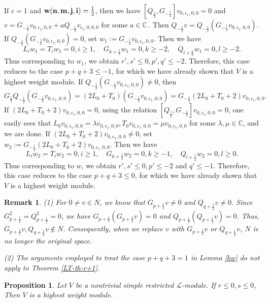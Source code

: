 \documentclass[12pt]{article}
\def\ssc{\scriptscriptstyle}
\def\C{\mathbb{C}{\ssc\,}}
\numberwithin{equation}{section}
\newtheorem{rema}[theo]{Remark}
\newtheorem{prop}[theo]{Proposition}
\begin{document}
If $c=1$ and ${\bf w(n,m,j,i)}=\frac{1}{2}$, then we have $[Q_{\frac{1}{2}},G_{-\frac{1}{2}}]v_{0,\epsilon_1,0,0}=0$ and $v=G_{-\frac{1}{2}}v_{0,\epsilon_1,0,0}+a Q_{-\frac{1}{2}}v_{\epsilon_1,0,0,0}$ for some $a\in\C$.
Then  $Q_{-\frac{1}{2}}v=Q_{-\frac{1}{2}}(G_{-\frac{1}{2}}v_{0,\epsilon_1,0,0}).$ If $Q_{-\frac{1}{2}}(G_{-\frac{1}{2}}v_{0,\epsilon_1,0,0})=0$, set $w_1:=G_{-\frac{1}{2}}v_{0,\epsilon_1,0,0}$. Then  we  have
$$L_iw_1=T_iw_1=0, i\ge 1,\quad G_{k+\frac{1}{2}}w_1=0,k\ge -2,\quad Q_{l+\frac{1}{2}}w_1=0,l\ge -2.$$
Thus corresponding to $w_1$, we obtain $r',s'\le 0, p',q'\le -2.$  Therefore, this case reduces to the case $p+q+3\le -1$, for  which we have already shown that $V$ is  a highest weight module.
If $Q_{-\frac{1}{2}}(G_{-\frac{1}{2}}v_{0,\epsilon_1,0,0})\ne 0$, then $$G_{\frac{1}{2}}Q_{-\frac{1}{2}}(G_{-\frac{1}{2}}v_{0,\epsilon_1,0,0})=(2L_0+T_0)(G_{-\frac{1}{2}}v_{0,\epsilon_1,0,0})=G_{-\frac{1}{2}}(2L_0+T_0+2)v_{0,\epsilon_1,0,0}.$$
If $(2L_0+T_0+2)v_{0,\epsilon_1,0,0}=0$, using the relation $[Q_{\frac{1}{2}},G_{-\frac{1}{2}}]v_{0,\epsilon_1,0,0}=0$, one easily sees that $L_0v_{0,\epsilon_1,0,0}=\lambda v_{0,\epsilon_1,0,0}, T_0v_{0,\epsilon_1,0,0}=\mu v_{0,\epsilon_1,0,0}$ for some \(\lambda,\mu\in\mathbb{C}\), and we are done. If $(2L_0+T_0+2)v_{0,\epsilon_1,0,0}\ne 0$, set $w_2:=G_{-\frac{1}{2}}(2L_0+T_0+2)v_{0,\epsilon_1,0,0}$. Then  we have
$$L_iw_2=T_iw_2=0, i\ge 1,\quad G_{k+\frac{1}{2}}w_2=0,k\ge -1,\quad Q_{l+\frac{1}{2}}w_2=0,l\ge 0.$$
Thus corresponding to $w$, we obtain $r',s'\le 0, p'\le -2$ and $q'\le -1.$  Therefore, this case reduces to the case $p+q+3\le 0$, for  which we have already shown that $V$ is a highest weight module.

\begin{rema} (1) For $0\ne v\in N$, we know that $G_{p+\frac{1}{2}}v\ne 0$ and  $Q_{q+\frac{1}{2}}v\ne 0$. Since $G^2_{p+\frac{1}{2}}=Q^2_{p+\frac{1}{2}}=0$, we have $G_{p+\frac{1}{2}}(G_{p+\frac{1}{2}}v)=0$ and $Q_{p+\frac{1}{2}}(Q_{p+\frac{1}{2}}v)=0$. Thus, $G_{p+\frac{1}{2}}v, Q_{q+\frac{1}{2}}v \notin N$. Consequently, when we replace $v$ with $G_{p+\frac{1}{2}}v$ or $Q_{q+\frac{1}{2}}v$, $N$ is no longer the original space.

(2) The arguments employed to treat the case $p+q+3=1$ in Lemma \ref{hw} do not apply to Theorem \ref{LT-th-r+1}.
\end{rema}



\begin{prop}\label{hwrs0} Let $V$ be a nontrivial simple  restricted $\mathcal{L}$-module.  If $r\le 0, s\le 0$, Then $V$ is a highest weight module.
\end{prop}
\end{document}
